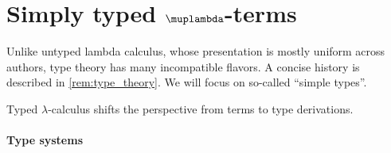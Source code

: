 \section{Simply typed \texorpdfstring{\( \muplambda \)}{λ}-terms}\label{sec:simply_typed_lambda_terms}

Unlike untyped lambda calculus, whose presentation is mostly uniform across authors, type theory has many incompatible flavors. A concise history is described in \cref{rem:type_theory}. We will focus on so-called \enquote{simple types}.

Typed \( \lambda \)-calculus shifts the perspective from terms to type derivations.

\paragraph{Type systems}

